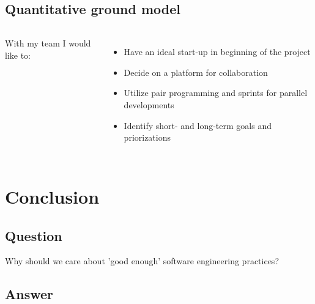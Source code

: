 \documentclass[usenames,dvipsnames]{beamer}
\theoremstyle{plain}
\theoremstyle{definition}
\begin{document}
\subsection{Quantitative ground model}

\begin{frame}{\setframetitle{}}
  \begin{columns}[t]
    With my team I would like to: 
    \begin{itemize}
      \item Have an ideal start-up in beginning of the project 
      
      \item Decide on a platform for collaboration
      
      \item Utilize pair programming and sprints for parallel developments
      
      \item Identify short- and long-term goals and priorizations
      
    \end{itemize}
  
  \end{columns}
  
\end{frame}







\section{Conclusion}
\subsection{Question}


\begin{frame}{\setframetitle{}}
  {
\centering


\Large  Why should we care about 'good enough' software engineering practices?

}
\end{frame}

\subsection{Answer}
\end{document}

